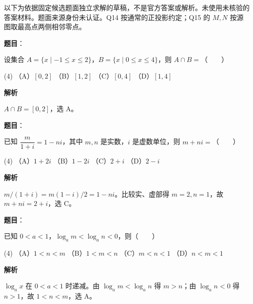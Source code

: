 

\begin{gktip}
以下为依据固定候选题面独立求解的草稿，不是官方答案或解析。未使用未核验的答案材料。题面来源身份未认证。Q14 按通常的正投影约定；Q15 的 $M,N$ 按源图取最高点两侧相邻零点。
\end{gktip}

\begin{answer}

\textbf{题目}：

设集合 $A=\{x\mid -1\leqslant x\leqslant2\}$，$B=\{x\mid 0\leqslant x\leqslant4\}$，则 $A\cap B=$\mbox{（　　）}

\begin{gkopts}(4)
\task （A）$[0,2]$
\task （B）$[1,2]$
\task （C）$[0,4]$
\task （D）$[1,4]$
\end{gkopts}

\textbf{解析}

$A\cap B=[0,2]$，选 A。


\end{answer}
\begin{answer}

\textbf{题目}：

已知 $\dfrac{m}{1+i}=1-ni$，其中 $m,n$ 是实数，$i$ 是虚数单位，则 $m+ni=$\mbox{（　　）}

\begin{gkopts}(4)
\task （A）$1+2i$
\task （B）$1-2i$
\task （C）$2+i$
\task （D）$2-i$
\end{gkopts}

\textbf{解析}

$m/(1+i)=m(1-i)/2=1-ni$。比较实、虚部得 $m=2,n=1$，故 $m+ni=2+i$，选 C。


\end{answer}
\begin{answer}

\textbf{题目}：

已知 $0<a<1$，$\log_a m<\log_a n<0$，则\mbox{（　　）}

\begin{gkopts}(4)
\task （A）$1<n<m$
\task （B）$1<m<n$
\task （C）$m<n<1$
\task （D）$n<m<1$
\end{gkopts}

\textbf{解析}

$\log_a x$ 在 $0<a<1$ 时递减。由 $\log_a m<\log_a n$ 得 $m>n$；由 $\log_a n<0$ 得 $n>1$，故 $1<n<m$，选 A。


\end{answer}
